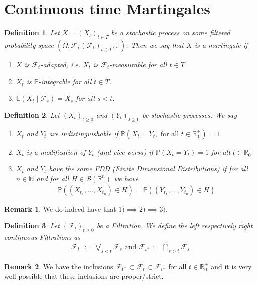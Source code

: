 \documentclass[11pt,a4paper, final]{article}
\newtheorem{defn}{Definition}[section]
\theoremstyle{definition}
\newtheorem{rem}{Remark}[section]
\begin{document}
\section{Continuous time Martingales}
\begin{defn} Let $X=(X_t)_{t \in T}$ be a stochastic process on some filtered probability space $( \Omega, \mathcal{F}, ( \mathcal{F}_t)_{t \in T}, \mathbb{P})$. Then we say that $X$ is a martingale if  
\begin{enumerate}
\item $X$ is $\mathcal{F}_t$-adapted, i.e. $X_t$ is $\mathcal{F}_t$-measurable for all $t \in T$.
\item $X_t$ is $\mathbb{P}$-integrable for all $t \in T$. 
\item $\mathbb{E}(X_t \mid \mathcal{F}_s) = X_s$ for all $s < t$.
\end{enumerate}
\end{defn}
\begin{defn} Let $(X_t)_{t \geq 0}$ and $(Y_t)_{t \geq 0}$ be stochastic processes. We say 
\begin{enumerate}
\item $X_t$ and $Y_t$ are indistinguishable if  $\mathbb{P}(X_t = Y_t, \text{ for all } t \in \mathbb{R}_0^+)=1$
\item $X_t$ is a modification of $Y_t$ (and vice versa) if $\mathbb{P}(X_t=Y_t)=1$ for all $t \in \mathbb{R}_0^+$ 
\item $X_t$ and $Y_t$ have the same FDD (Finite Dimensional Distributions) if for all $n \in \mathbb{N}$ and for all $H \in \mathcal{B}( \mathbb{R}^n)$ we have 
\begin{align*}
\mathbb{P}( (X_{t_1}, \dots , X_{t_n}) \in H ) = \mathbb{P}( (Y_{t_1}, \dots , Y_{t_n}) \in H)
\end{align*}
\end{enumerate}
\end{defn}
\begin{rem} We do indeed have that $1) \implies 2) \implies 3)$. 
\end{rem}
\begin{defn} Let $(\mathcal{F}_t)_{t \geq 0}$ be a Filtration. We define the left respectively right continuous Filtrations as 
\begin{align*}
\mathcal{F}_{t^-}:= \bigvee_{s <t} \mathcal{F}_s \text{ and } \mathcal{F}_{t^+} := \bigcap_{s >t} \mathcal{F}_s
\end{align*}
\end{defn}
\begin{rem} We have the inclusions $\mathcal{F}_{t^-} \subset \mathcal{F}_t \subset \mathcal{F}_{t^+}$ for all $t \in \mathbb{R}_0^+$ and it is very well possible that these inclusions are proper/strict. 
\end{rem}
\end{document}
